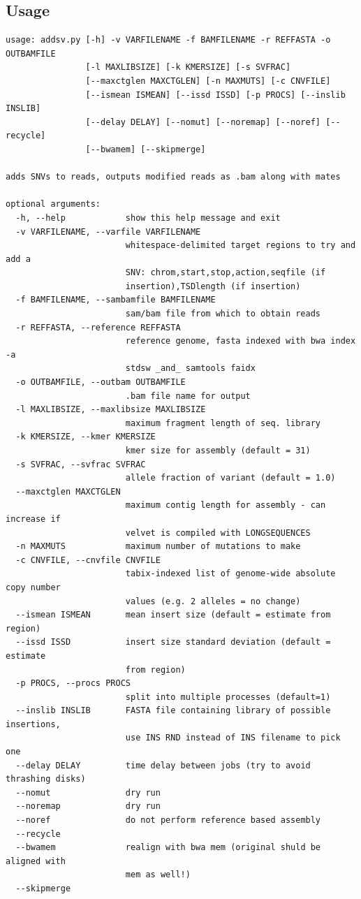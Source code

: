 \documentclass[letterpaper,11pt]{article}
\begin{document}
\subsection{Usage}
\begin{verbatim}
usage: addsv.py [-h] -v VARFILENAME -f BAMFILENAME -r REFFASTA -o OUTBAMFILE
                [-l MAXLIBSIZE] [-k KMERSIZE] [-s SVFRAC]
                [--maxctglen MAXCTGLEN] [-n MAXMUTS] [-c CNVFILE]
                [--ismean ISMEAN] [--issd ISSD] [-p PROCS] [--inslib INSLIB]
                [--delay DELAY] [--nomut] [--noremap] [--noref] [--recycle]
                [--bwamem] [--skipmerge]

adds SNVs to reads, outputs modified reads as .bam along with mates

optional arguments:
  -h, --help            show this help message and exit
  -v VARFILENAME, --varfile VARFILENAME
                        whitespace-delimited target regions to try and add a
                        SNV: chrom,start,stop,action,seqfile (if
                        insertion),TSDlength (if insertion)
  -f BAMFILENAME, --sambamfile BAMFILENAME
                        sam/bam file from which to obtain reads
  -r REFFASTA, --reference REFFASTA
                        reference genome, fasta indexed with bwa index -a
                        stdsw _and_ samtools faidx
  -o OUTBAMFILE, --outbam OUTBAMFILE
                        .bam file name for output
  -l MAXLIBSIZE, --maxlibsize MAXLIBSIZE
                        maximum fragment length of seq. library
  -k KMERSIZE, --kmer KMERSIZE
                        kmer size for assembly (default = 31)
  -s SVFRAC, --svfrac SVFRAC
                        allele fraction of variant (default = 1.0)
  --maxctglen MAXCTGLEN
                        maximum contig length for assembly - can increase if
                        velvet is compiled with LONGSEQUENCES
  -n MAXMUTS            maximum number of mutations to make
  -c CNVFILE, --cnvfile CNVFILE
                        tabix-indexed list of genome-wide absolute copy number
                        values (e.g. 2 alleles = no change)
  --ismean ISMEAN       mean insert size (default = estimate from region)
  --issd ISSD           insert size standard deviation (default = estimate
                        from region)
  -p PROCS, --procs PROCS
                        split into multiple processes (default=1)
  --inslib INSLIB       FASTA file containing library of possible insertions,
                        use INS RND instead of INS filename to pick one
  --delay DELAY         time delay between jobs (try to avoid thrashing disks)
  --nomut               dry run
  --noremap             dry run
  --noref               do not perform reference based assembly
  --recycle
  --bwamem              realign with bwa mem (original shuld be aligned with
                        mem as well!)
  --skipmerge


\end{verbatim}
\end{document}
